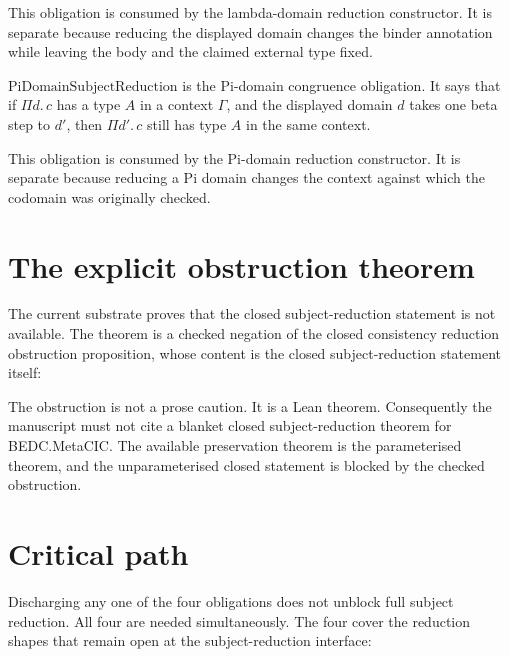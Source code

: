 This obligation is consumed by the lambda-domain reduction constructor. It is separate because reducing the displayed domain changes the binder annotation while leaving the body and the claimed external type fixed.

\begin{definition}[PiDomainSubjectReduction]
\label{def:metacic-pi-domain-subject-reduction}
$\mathrm{PiDomainSubjectReduction}$ is the Pi-domain congruence obligation. It says that if $\Pi d.\,c$ has a type $A$ in a context $\Gamma$, and the displayed domain $d$ takes one beta step to $d'$, then $\Pi d'.\,c$ still has type $A$ in the same context.
\end{definition}

This obligation is consumed by the Pi-domain reduction constructor. It is separate because reducing a Pi domain changes the context against which the codomain was originally checked.

\section{The explicit obstruction theorem}
\label{sec:metacic-subject-reduction-explicit-obstruction}

\begin{principle}
\label{prin:metacic-closed-subject-reduction-not-available}
The current substrate proves that the closed subject-reduction statement is not available. The theorem is a checked negation of the closed consistency reduction obstruction proposition, whose content is the closed subject-reduction statement itself:
\end{principle}

The obstruction is not a prose caution. It is a Lean theorem. Consequently the manuscript must not cite a blanket closed subject-reduction theorem for BEDC.MetaCIC. The available preservation theorem is the parameterised theorem, and the unparameterised closed statement is blocked by the checked obstruction.

\section{Critical path}
\label{sec:metacic-subject-reduction-critical-path}

Discharging any one of the four obligations does not unblock full subject reduction. All four are needed simultaneously. The four cover the reduction shapes that remain open at the subject-reduction interface:

